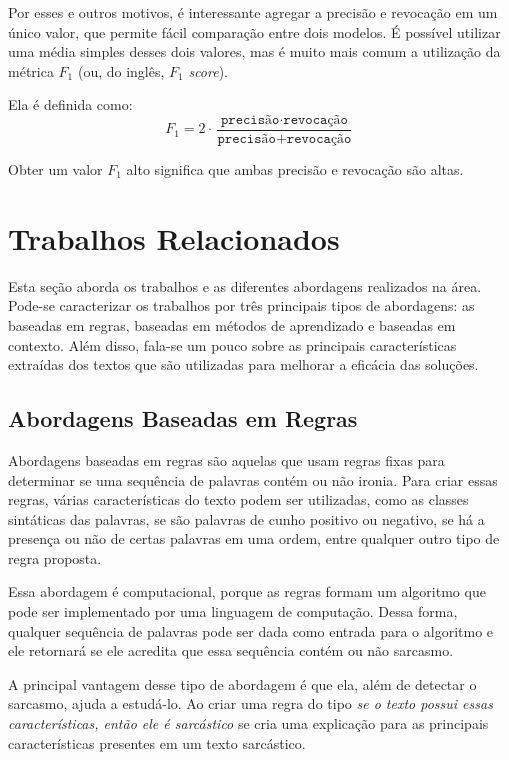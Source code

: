 Por esses e outros motivos, é interessante agregar a precisão e revocação em um
único valor, que permite fácil comparação entre dois modelos. É possível
utilizar uma média simples desses dois valores, mas é muito mais comum a
utilização da métrica $F_1$ (ou, do inglês, $F_1$ \textit{score}).

Ela é definida como:
\[
F_1=2\cdot
\dfrac{\texttt{precisão}\cdot\texttt{revocação}}
{\texttt{precisão}+\texttt{revocação}}
\]

Obter um valor $F_1$ alto significa que ambas precisão e revocação são altas.

\section{Trabalhos Relacionados}%
\label{sec:trabalhos_relacionados}

Esta seção aborda os trabalhos e as diferentes abordagens realizados na área.
Pode-se caracterizar os trabalhos por três principais tipos de abordagens: as
baseadas em regras, baseadas em métodos de aprendizado e baseadas em contexto.
Além disso, fala-se um pouco sobre as principais características extraídas dos
textos que são utilizadas para melhorar a eficácia das soluções.

\subsection{Abordagens Baseadas em Regras}%
\label{sub:abordagens_baseados_em_regras}

Abordagens baseadas em regras são aquelas que usam regras fixas para determinar
se uma sequência de palavras contém ou não ironia. Para criar essas regras,
várias características do texto podem ser utilizadas, como as classes sintáticas
das palavras, se são palavras de cunho positivo ou negativo, se há a presença ou
não de certas palavras em uma ordem, entre qualquer outro tipo de regra
proposta.

Essa abordagem é computacional, porque as regras formam um algoritmo que pode
ser implementado por uma linguagem de computação. Dessa forma, qualquer
sequência de palavras pode ser dada como entrada para o algoritmo e ele
retornará se ele acredita que essa sequência contém ou não sarcasmo.

A principal vantagem desse tipo de abordagem é que ela, além de detectar o
sarcasmo, ajuda a estudá-lo. Ao criar uma regra do tipo \textit{se o texto
possui essas características, então ele é sarcástico} se cria uma explicação
para as principais características presentes em um texto sarcástico.

